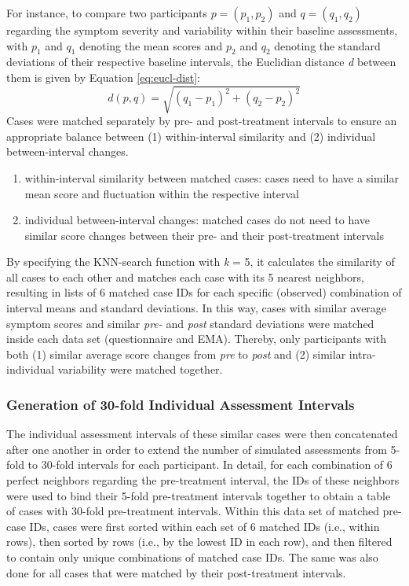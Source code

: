 \documentclass[12pt,twoside]{reedthesis}
\providecommand{\tightlist}{%
  \setlength{\itemsep}{0pt}\setlength{\parskip}{0pt}}
\begin{document}
For instance, to compare two participants \(p = (p_{1},p_{2})\) and \(q = (q_{1},q_{2})\) regarding the symptom severity and variability within their baseline assessments, with \(p_{1}\) and \(q_{1}\) denoting the mean scores and \(p_{2}\) and \(q_{2}\) denoting the standard deviations of their respective baseline intervals, the Euclidian distance \emph{d} between them is given by Equation \eqref{eq:eucl-dist}:
\begin{equation}
d(p,q) = \sqrt{(q_{1} - p_{1})^2 + (q_{2} - p_{2})^2} \label{eq:eucl-dist}
\end{equation}
Cases were matched separately by pre- and post-treatment intervals to ensure an appropriate balance between (1) within-interval similarity and (2) individual between-interval changes.
\begin{enumerate}
\def\labelenumi{\arabic{enumi}.}
\tightlist
\item
  within-interval similarity between matched cases: cases need to have a similar mean score and fluctuation within the respective interval
\item
  individual between-interval changes: matched cases do not need to have similar score changes between their pre- and their post-treatment intervals
\end{enumerate}
\par

By specifying the KNN-search function with \emph{k} = 5, it calculates the similarity of all cases to each other and matches each case with its 5 nearest neighbors, resulting in lists of 6 matched case IDs for each specific (observed) combination of interval means and standard deviations. In this way, cases with similar average symptom scores and similar \emph{pre-} and \emph{post} standard deviations were matched inside each data set (questionnaire and EMA). Thereby, only participants with both (1) similar average score changes from \emph{pre} to \emph{post} and (2) similar intra-individual variability were matched together.

\hypertarget{generation-of-30-fold-individual-assessment-intervals}{%
\subsubsection{Generation of 30-fold Individual Assessment Intervals}\label{generation-of-30-fold-individual-assessment-intervals}}

The individual assessment intervals of these similar cases were then concatenated after one another in order to extend the number of simulated assessments from 5-fold to 30-fold intervals for each participant. In detail, for each combination of 6 perfect neighbors regarding the pre-treatment interval, the IDs of these neighbors were used to bind their 5-fold pre-treatment intervals together to obtain a table of cases with 30-fold pre-treatment intervals. Within this data set of matched pre-case IDs, cases were first sorted within each set of 6 matched IDs (i.e., within rows), then sorted by rows (i.e., by the lowest ID in each row), and then filtered to contain only unique combinations of matched case IDs. The same was also done for all cases that were matched by their post-treatment intervals.
\end{document}
